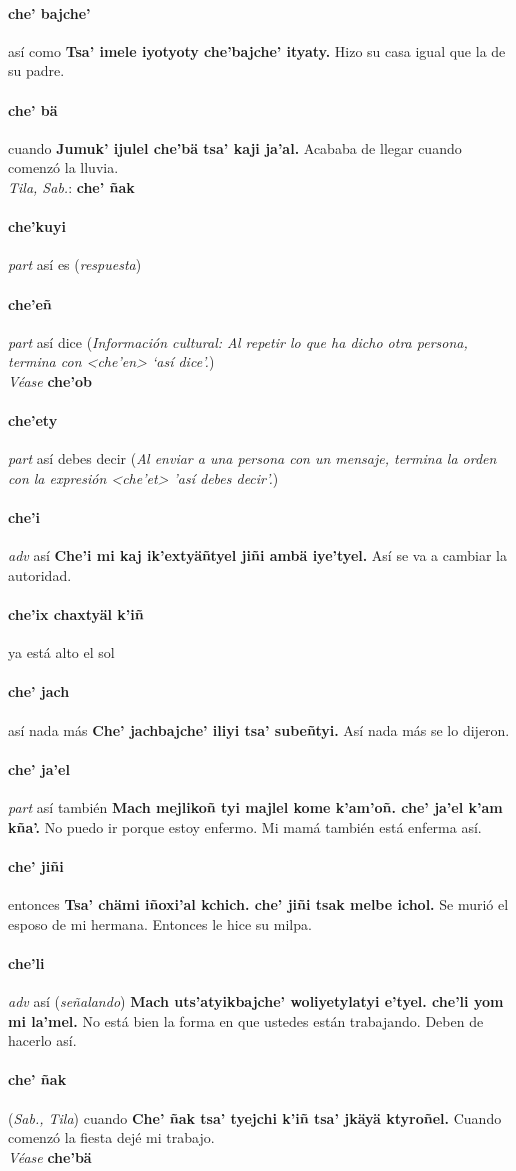 \documentclass{scrbook}
\newcommand{\entry}[1]{\paragraph{#1}}
\newcommand{\partofspeech}[1]{\textit{#1}}
\newcommand{\spanishtranslation}[1]{#1}
\newcommand{\clarification}[1]{(\textit{#1})}
\newcommand{\cholexample}[1]{\textbf{#1}}
\newcommand{\exampletranslation}[1]{#1}
\newcommand{\dialectvariant}[1]{\\\textit{#1}:}
\newcommand{\dialectword}[1]{\textbf{#1}}
\newcommand{\alsosee}[1]{\\\textit{Véase} \textbf{#1}}
\newcommand{\relevantdialect}[1]{(\textit{#1})}
\newcommand{\culturalinformation}[1]{(\textit{#1})}
\begin{document}
\begin{multicols}{2}
\entry{che' bajche'}
\spanishtranslation{así como}
\cholexample{Tsa' imele iyotyoty che'bajche' ityaty.}
\exampletranslation{Hizo su casa igual que la de su padre.}

\entry{che' bä}
\spanishtranslation{cuando}
\cholexample{Jumuk' ijulel che'bä tsa' kaji ja'al.}
\exampletranslation{Acababa de llegar cuando comenzó la lluvia.}
\dialectvariant{Tila, Sab.}
\dialectword{che' ñak}

\entry{che'kuyi}
\partofspeech{part}
\spanishtranslation{así es}
\clarification{respuesta}

\entry{che'eñ}
\partofspeech{part}
\spanishtranslation{así dice}
\culturalinformation{Información cultural: Al repetir lo que ha dicho otra persona, termina con <che'en> ‘así dice’.}
\alsosee{che'ob}

\entry{che'ety}
\partofspeech{part}
\spanishtranslation{así debes decir}
\clarification{Al enviar a una persona con un mensaje, termina la orden con la expresión <che'et> 'así debes decir'.}

\entry{che'i}
\partofspeech{adv}
\spanishtranslation{así}
\cholexample{Che'i mi kaj ik'extyäñtyel jiñi ambä iye'tyel.}
\exampletranslation{Así se va a cambiar la autoridad.}

\entry{che'ix chaxtyäl k'iñ}
\spanishtranslation{ya está alto el sol}

\entry{che' jach}
\spanishtranslation{así nada más}
\cholexample{Che' jachbajche' iliyi tsa' subeñtyi.}
\exampletranslation{Así nada más se lo dijeron.}

\entry{che' ja'el}
\partofspeech{part}
\spanishtranslation{así también}
\cholexample{Mach mejlikoñ tyi majlel kome k'am'oñ. che' ja'el k'am kña'.}
\exampletranslation{No puedo ir porque estoy enfermo. Mi mamá también está enferma así.}

\entry{che' jiñi}
\spanishtranslation{entonces}
\cholexample{Tsa' chämi iñoxi'al kchich. che' jiñi tsak melbe ichol.}
\exampletranslation{Se murió el esposo de mi hermana. Entonces le hice su milpa.}

\entry{che'li}
\partofspeech{adv}
\spanishtranslation{así}
\clarification{señalando}
\cholexample{Mach uts'atyikbajche' woliyetylatyi e'tyel. che'li yom mi la'mel.}
\exampletranslation{No está bien la forma en que ustedes están trabajando. Deben de hacerlo así.}

\entry{che' ñak}
\relevantdialect{Sab., Tila}
\spanishtranslation{cuando}
\cholexample{Che' ñak tsa' tyejchi k'iñ tsa' jkäyä ktyroñel.}
\exampletranslation{Cuando comenzó la fiesta dejé mi trabajo.}
\alsosee{che'bä}


\end{multicols}
\end{document}
